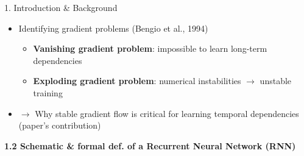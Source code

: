 \begin{frame}[t]
\begin{columns}[t,totalwidth=\textwidth]
\begin{column}{0.3\textwidth}
\begin{block}{1. Introduction \& Background}
\begin{itemize}
            \item Identifying gradient problems (Bengio et al., 1994)
            \begin{itemize}
                \item \textbf{Vanishing gradient problem}: impossible to learn long-term dependencies
                \item \textbf{Exploding gradient problem}: numerical instabilities $\rightarrow$ unstable training
            \end{itemize}

            \item $\rightarrow$ Why stable gradient flow is critical for learning temporal dependencies (paper's contribution)
            \end{itemize}

        \vspace{1em}

        \textbf{1.2 Schematic \& formal def. of a Recurrent Neural Network (RNN)}

            
            
        
            



\end{block}
\end{column}
\end{columns}
\end{frame}

